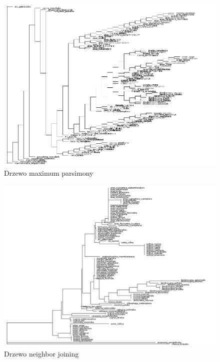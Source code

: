 \documentclass[12pt]{article}
\begin{document}
\begin{figure}[H]
\begin{center}
\includegraphics[width=\textwidth]{mp}
\caption{Drzewo maximum parsimony}
\end{center}
\end{figure}

\begin{figure}[H]
\begin{center}
\includegraphics[width=\textwidth]{nj}
\caption{Drzewo neighbor joining}
\end{center}
\end{figure}
\end{document}
